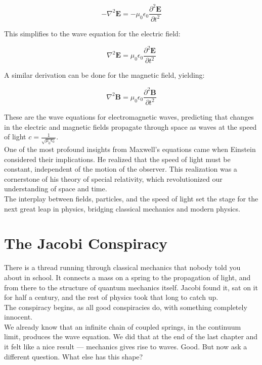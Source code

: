 \documentclass[krantz1,ChapterTOCs]{krantz}
\begin{document}
\[
-\nabla^2 \mathbf{E} = -\mu_0 \epsilon_0 \frac{\partial^2 \mathbf{E}}{\partial t^2}
\]

This simplifies to the wave equation for the electric field:

\[
\nabla^2 \mathbf{E} = \mu_0 \epsilon_0 \frac{\partial^2 \mathbf{E}}{\partial t^2}
\]

A similar derivation can be done for the magnetic field, yielding:

\[
\nabla^2 \mathbf{B} = \mu_0 \epsilon_0 \frac{\partial^2 \mathbf{B}}{\partial t^2}
\]

These are the wave equations for electromagnetic waves, predicting that changes in the electric and magnetic fields propagate through space as waves at the speed of light \( c = \frac{1}{\sqrt{\mu_0 \epsilon_0}} \).\\

One of the most profound insights from Maxwell's equations came when Einstein considered their implications. He realized that the speed of light must be constant, independent of the motion of the observer. This realization was a cornerstone of his theory of special relativity, which revolutionized our understanding of space and time.\\

The interplay between fields, particles, and the speed of light set the stage for the next great leap in physics, bridging classical mechanics and modern physics.


\part{The Jacobi Conspiracy}

There is a thread running through classical mechanics that nobody told you about in school. It connects a mass on a spring to the propagation of light, and from there to the structure of quantum mechanics itself. Jacobi found it, sat on it for half a century, and the rest of physics took that long to catch up.\\

The conspiracy begins, as all good conspiracies do, with something completely innocent.\\

We already know that an infinite chain of coupled springs, in the continuum limit, produces the wave equation. We did that at the end of the last chapter and it felt like a nice result --- mechanics gives rise to waves. Good. But now ask a different question. What else has this shape?\\
\end{document}
